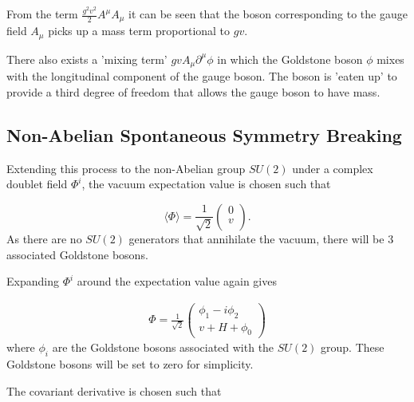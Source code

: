 \documentclass{article}
\begin{document}
From the term $\frac{g^2v^2}{2}A^\mu A_\mu$ it can be seen that the boson corresponding to the gauge field $A_\mu$ picks up a mass term proportional to $gv$.

There also exists a 'mixing term' $gvA_\mu\partial^\mu\phi$ in which the Goldstone boson $\phi$ mixes with the longitudinal component of the gauge boson. The boson is 'eaten up' to provide a third degree of freedom that allows the gauge boson to have mass. 
\subsection{Non-Abelian Spontaneous Symmetry Breaking}%
\label{sec:SM_naSSB}
Extending this process to the non-Abelian group $SU(2)$ under a complex doublet field $\Phi^i$, the vacuum expectation value is chosen such that

\begin{equation}
\langle\Phi\rangle = \frac{1}{\sqrt{2}}\left(\begin{matrix}
0 \\
v \\
\end{matrix}\right).
\end{equation}
As there are no $SU(2)$ generators that annihilate the vacuum, there will be 3 associated Goldstone bosons.


Expanding $\Phi^i$ around the expectation value again gives

\begin{equation}
\begin{split}
\Phi = \frac{1}{\sqrt{2}}\left(
\begin{matrix}
\phi_1 - i\phi_2 \\
v + H + \phi_0
\end{matrix}\right)
\end{split}
\end{equation}
where $\phi_i$ are the Goldstone bosons associated with the $SU(2)$ group. These Goldstone bosons will be set to zero for simplicity.


The covariant derivative is chosen such that
\end{document}
